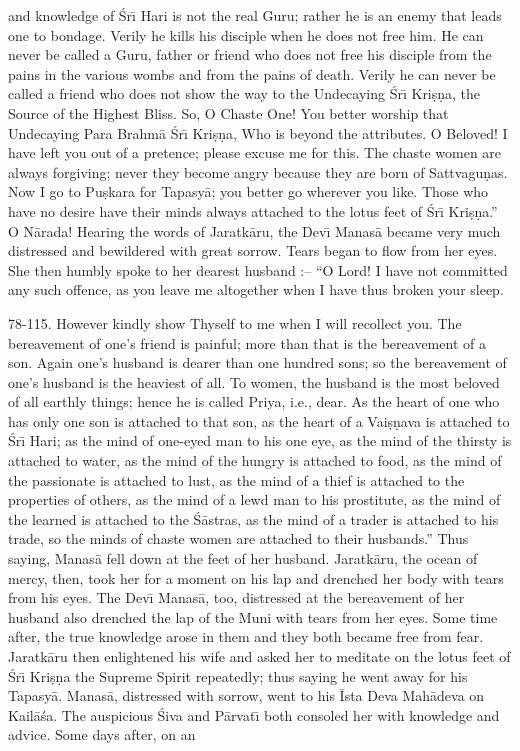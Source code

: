 and knowledge of \'Sr\={\i} Hari is not the real Guru; rather he is an enemy that leads one to bondage. Verily he kills his disciple when he does not free him. He can never be called a Guru, father or friend who does not free his disciple from the pains in the various wombs and from the pains of death. Verily he can never be called a friend who does not show the way to the Undecaying \'Sr\={\i} Kri\d{s}\d{n}a, the Source of the Highest Bliss. So, O Chaste One! You better worship that Undecaying Para Brahm\=a \'Sr\={\i} Kri\d{s}\d{n}a, Who is beyond the attributes. O Beloved! I have left you out of a pretence; please excuse me for this. The chaste women are always forgiving; never they become angry because they are born of Sattvagu\d{n}as. Now I go to Pu\d{s}kara for Tapasy\=a; you better go wherever you like. Those who have no desire have their minds always attached to the lotus feet of \'Sr\={\i} Kri\d{s}\d{n}a.'' O N\=arada! Hearing the words of Jaratk\=aru, the Dev\={\i} Manas\=a became very much distressed and bewildered with great sorrow. Tears began to flow from her eyes. She then humbly spoke to her dearest husband :-- ``O Lord! I have not committed any such offence, as you leave me altogether when I have thus broken your sleep.

78-115. However kindly show Thyself to me when I will recollect you. The bereavement of one's friend is painful; more than that is the bereavement of a son. Again one's husband is dearer than one hundred sons; so the bereavement of one's husband is the heaviest of all. To women, the husband is the most beloved of all earthly things; hence he is called Priya, i.e., dear. As the heart of one who has only one son is attached to that son, as the heart of a Vai\d{s}\d{n}ava is attached to \'Sr\={\i} Hari; as the mind of one-eyed man to his one eye, as the mind of the thirsty is attached to water, as the mind of the hungry is attached to food, as the mind of the passionate is attached to lust, as the mind of a thief is attached to the properties of others, as the mind of a lewd man to his prostitute, as the mind of the learned is attached to the \'S\=astras, as the mind of a trader is attached to his trade, so the minds of chaste women are attached to their husbands.'' Thus saying, Manas\=a fell down at the feet of her husband. Jaratk\=aru, the ocean of mercy, then, took her for a moment on his lap and drenched her body with tears from his eyes. The Dev\={\i} Manas\=a, too, distressed at the bereavement of her husband also drenched the lap of the Muni with tears from her eyes. Some time after, the true knowledge arose in them and they both became free from fear. Jaratk\=aru then enlightened his wife and asked her to meditate on the lotus feet of \'Sr\={\i} Kri\d{s}\d{n}a the Supreme Spirit repeatedly; thus saying he went away for his Tapasy\=a. Manas\=a, distressed with sorrow, went to his \=Ista Deva Mah\=adeva on Kail\=a\'sa. The auspicious \'Siva and P\=arvat\={\i} both consoled her with knowledge and advice. Some days after, on an

